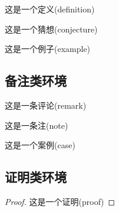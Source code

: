 \documentclass[cn,hazy,blue,11pt,device=normal,chinesefont=founder]{elegantnote}
\begin{document}
\begin{definition}[名称]
  这是一个定义(definition)
\end{definition}

\begin{conjecture}[名称]
  这是一个猜想(conjecture)
\end{conjecture}

\begin{example}[名称]
  这是一个例子(example)
\end{example}

\subsection{备注类环境}

\begin{remark}[名称]
  这是一条评论(remark)
\end{remark}

\begin{note}[名称]
  这是一条注(note)
\end{note}

\begin{case}[名称]
  这是一个案例(case)
\end{case}

\subsection{证明类环境}

\begin{proof}
  这是一个证明(proof)
\end{proof}
\end{document}
